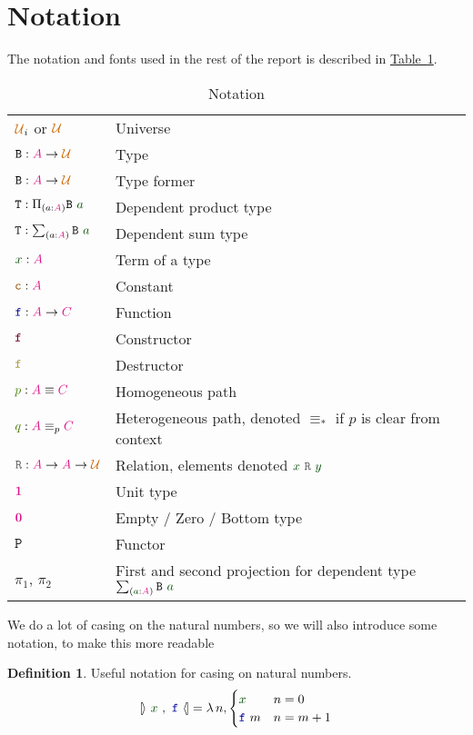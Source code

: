 \documentclass[twoside,11pt,openright]{report}
\theoremstyle{plain} %
\theoremstyle{definition}
\newtheorem{defn}[thm]{Definition}%
\theoremstyle{remark}
\newcommand*{\tableref}[1]{\hyperref[table:#1]{Table~\ref*{table:#1}}}
\newcommand*{\term}[1]{\textcolor{green!30!black}{#1}} %
\newcommand*{\pathterm}[1]{\textcolor{green!65!red!75!black}{#1}}
\newcommand*{\type}[1]{\textcolor{magenta!90!black}{#1}}
\newcommand*{\universe}[1]{\textcolor{orange!80!black}{#1}}
\newcommand*{\unit}{\type{\textbf{1}}}
\newcommand*{\empt}{\type{\textbf{0}}}
\newcommand*{\relation}[1]{\textcolor{gray!75!black}{\ensuremath{\mathtt{#1}}}}
\newcommand*{\constant}[1]{\textcolor{orange!60!black}{\ensuremath{\mathtt{#1}}}}
\newcommand*{\function}[1]{\textcolor{blue!60!black}{\ensuremath{\mathtt{#1}}}}
\newcommand*{\constructor}[1]{\textcolor{purple!60!black}{\ensuremath{\mathtt{#1}}}}
\newcommand*{\destructor}[1]{\textcolor{yellow!60!black}{\ensuremath{\mathtt{#1}}}}
\newcommand*{\typeformer}[1]{\ensuremath{\mathtt{#1}}}
\newcommand*{\functor}[1]{\ensuremath{\mathbf{\mathtt{#1}}}}
\newcommand*{\natcases}[2]{\ensuremath{\mathbb{[\hspace{-.5mm}\rangle}~\ensuremath{#1}~,~\ensuremath{#2}~\mathbb{\langle\hspace{-.5mm}]}}}
\begin{document}
\section{Notation}
The notation and fonts used in the rest of the report is described in \tableref{notation}.
\begin{table}[h]
  \begin{tabular}[h]{ll}
    \(\universe{\mathcal{U}}_i\) or \(\universe{\mathcal{U}}\) & Universe \\
    \(\typeformer{B} : \type{A} \rightarrow \universe{\mathcal{U}}\) & Type \\
    \(\typeformer{B} : \type{A} \rightarrow \universe{\mathcal{U}}\) & Type former \\
    \(\typeformer{T} : \Pi_{(a : \type{A})} \typeformer{B}~\term{a}\) & Dependent product type \\
    \(\typeformer{T} : \sum_{(a : \type{A})} \typeformer{B}~\term{a}\) & Dependent sum type \\
    \(\term{x} : \type{A}\) & Term of a type \\
    \(\constant{c} : \type{A}\) & Constant \\
    \(\function{f} : \type{A} \rightarrow \type{C}\) & Function \\
    \(\constructor{f}\) & Constructor \\
    \(\destructor{f}\) & Destructor \\
    \(\pathterm{p} : \type{A} \equiv \type{C}\) & Homogeneous path \\
    \(\pathterm{q} : \type{A} \equiv_{p} \type{C}\) & Heterogeneous path, denoted \(\equiv_{*}\) if \(p\) is clear from context \\
    \(\relation{R} : \type{A} \rightarrow \type{A} \rightarrow \universe{\mathcal{U}}\) & Relation, elements denoted \(\term{x}~\relation{R}~\term{y}\)\\
    \(\unit\) & Unit type \\
    \(\empt\) & Empty / Zero / Bottom type \\
    \(\functor{P}\) & Functor \\
    \(\pi_1\), \(\pi_2\) &  First and second projection for dependent type \(\sum_{(\term{a} : \type{A})} \typeformer{B}~\term{a}\)
  \end{tabular}
  \caption{Notation}
  \label{table:notation}
\end{table}
We do a lot of casing on the natural numbers, so we will also introduce some notation, to make this more readable
\begin{defn}
  Useful notation for casing on natural numbers.
  \begin{equation}
    \natcases{\term{x}}{\function{f}} = \lambda\,n, \begin{cases} \term{x} & n = 0 \\ \function{f}~m & n = m + 1 \end{cases}
  \end{equation}
\end{defn}
\end{document}
